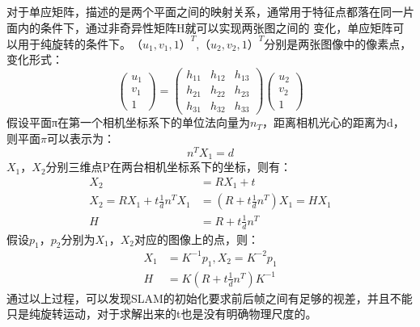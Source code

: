 对于单应矩阵，描述的是两个平面之间的映射关系，通常用于特征点都落在同一片面内的条件下，通过非奇异性矩阵H就可以实现两张图之间的
变化，单应矩阵可以用于纯旋转的条件下。$（u_1,v_1,1）^{T}$,$（u_2,v_2,1）^{T}$分别是两张图像中的像素点，变化形式：
\begin{equation}
\left(\begin{array}{l}{u_{1}} \\ {v_{1}} \\ {1}\end{array}\right)=\left(\begin{array}{lll}{h_{11}} & {h_{12}} & {h_{13}} \\ {h_{21}} & {h_{22}} & {h_{23}} \\ {h_{31}} & {h_{32}} & {h_{33}}\end{array}\right)\left(\begin{array}{l}{u_{2}} \\ {v_{2}} \\ {1}\end{array}\right)
\end{equation}
假设平面π在第一个相机坐标系下的单位法向量为$n_T$，距离相机光心的距离为d，则平面$\pi$可以表示为：
\begin{equation}
  n^{T} X_{1}=d
\end{equation}
$X_1$，$X_2$分别三维点P在两台相机坐标系下的坐标，则有：
\begin{equation}
  \begin{split}
    X_{2} &=R X_{1}+t \\ 
    X_{2}=R X_{1}+t \frac{1}{d} n^{T} X_{1} &=\left(R+t \frac{1}{d} n^{T}\right) X_{1}=H X_{1} \\ 
    H &=R+t \frac{1}{d} n^{T} 
  \end{split}
\end{equation}
假设$p_1$，$p_2$分别为$X_1$，$X_2$对应的图像上的点，则：
\begin{equation}
\begin{aligned} X_{1} &=K^{-1} p_{1}, X_{2}=K^{-2} p_{1} \\ H &=K\left(R+t \frac{1}{d} n^{T}\right) K^{-1} \end{aligned}
\end{equation}
通过以上过程，可以发现SLAM的初始化要求前后帧之间有足够的视差，并且不能只是纯旋转运动，对于求解出来的t也是没有明确物理尺度的。
